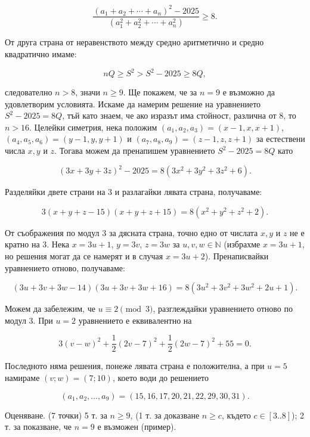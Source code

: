 $$\frac{(a_1+a_2+\cdots+a_n)^2-2025}{(a_1^2+a_2^2+\cdots+a_n^2)}\geq8.$$

От друга страна от неравенството между средно аритметично и средно квадратично имаме:

$$nQ\geq S^2>S^2-2025\geq8Q,$$

следователно $n>8$, значи $n\geq9$. Ще покажем, че за $n=9$ е възможно да удовлетворим условията. Искаме да намерим решение на уравнението $S^2-2025=8Q$, тъй като знаем, че ако изразът има стойност, различна от 8, то $n>16$. Целейки симетрия, нека положим $(a_1,a_2,a_3)=(x-1,x,x+1)$, $(a_4,a_5,a_6)=(y-1,y,y+1)$ и $(a_7,a_8,a_9)=(z-1,z,z+1)$ за естествени числа $x,y$ и $z$. Тогава можем да пренапишем уравнението $S^2-2025=8Q$ като

$$(3x+3y+3z)^2-2025=8(3x^2+3y^2+3z^2+6).$$

Разделяйки двете страни на 3 и разлагайки лявата страна, получаваме:

$$3(x+y+z-15)(x+y+z+15)=8(x^2+y^2+z^2+2).$$

От съображения по модул 3 за дясната страна, точно едно от числата $x,y$ и $z$ не е кратно на 3. Нека $x=3u+1$, $y=3v$, $z=3w$ за $u,v,w\in\mathbb N$ (избрахме $x=3u+1$, но решения могат да се намерят и в случая $x=3u+2$). Пренаписвайки уравнението отново, получаваме:

$$(3u+3v+3w-14)(3u+3v+3w+16)=8(3u^2+3v^2+3w^2+2u+1).$$

Можем да забележим, че $u\equiv2\pmod3$, разглеждайки уравнението отново по модул 3. При $u=2$ уравнението е еквивалентно на

$$3(v-w)^2+\frac12(2v-7)^2+\frac12(2w-7)^2+55=0.$$

Последното няма решения, понеже лявата страна е положителна, а при $u=5$ намираме $(v;w)=(7;10)$, което води до решението

$$(a_1,a_2,\ldots,a_9)=(15,16,17,20,21,22,29,30,31).$$

Оценяване. (7 точки) 5 т. за $n\geq9$, (1 т. за доказване $n\geq c$, където $c\in[3..8]$); 2 т. за показване, че $n=9$ е възможен (пример).

